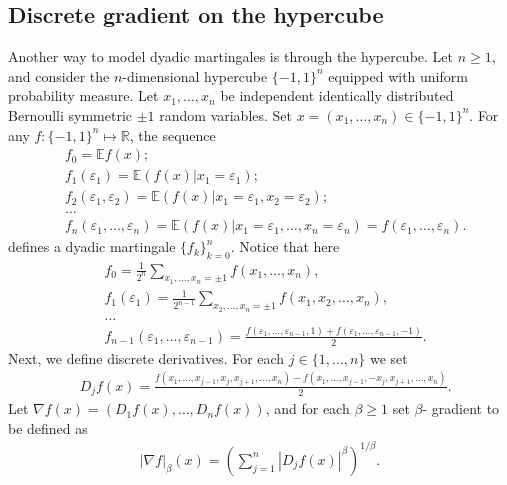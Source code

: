 \documentclass[11pt]{amsart}
\theoremstyle{definition}
\renewcommand{\1}{{\mathbbm{1}}}
\begin{document}
\subsection{Discrete gradient on the hypercube}\label{hypercc}
Another way to model dyadic martingales is through the hypercube. Let $n\geq 1$, and consider the $n$-dimensional hypercube $\{-1,1\}^{n}$ equipped with uniform probability measure. Let $x_{1}, \ldots, x_{n}$ be independent identically distributed Bernoulli symmetric  $\pm 1$ random variables. Set $x = (x_{1}, \ldots, x_{n}) \in \{-1,1\}^{n}$. For any $f:\{-1,1\}^{n} \mapsto \mathbb{R}$, the sequence
\begin{align*}
&f_{0}=\mathbb{E}f(x);\\
&f_{1}(\varepsilon_{1}) = \mathbb{E}(f(x)|x_{1}=\varepsilon_{1});\\
&f_{2}(\varepsilon_{1}, \varepsilon_{2}) = \mathbb{E}(f(x)|x_{1}=\varepsilon_{1}, x_{2}=\varepsilon_{2});\\
&\ldots \\
&f_{n}(\varepsilon_{1}, \ldots, \varepsilon_{n}) = \mathbb{E} (f(x)|x_{1}=\varepsilon_{1}, \ldots, x_{n}=\varepsilon_{n}) =f(\varepsilon_{1}, \ldots, \varepsilon_{n}). 
\end{align*}
defines a dyadic martingale $\{f_{k}\}_{k=0}^{n}$. Notice that here 
\begin{align*}
&f_{0} = \frac{1}{2^{n}}\sum_{x_{1}, \ldots, x_{n}=\pm 1} f(x_{1}, \ldots, x_{n}),\\
&f_{1}(\varepsilon_{1}) = \frac{1}{2^{n-1}}\sum_{x_{2}, \ldots, x_{n}=\pm 1} f(x_{1}, x_{2}, \ldots, x_{n}),\\
&\ldots\\
&f_{n-1}(\varepsilon_{1}, \ldots, \varepsilon_{n-1})=\frac{f(\varepsilon_{1}, \ldots, \varepsilon_{n-1}, 1)+f(\varepsilon_{1}, \ldots, \varepsilon_{n-1}, -1)}{2}.
\end{align*}
Next, we define discrete derivatives. For each $j \in \{1, \ldots, n\}$ we set 
\begin{align*}
    &D_{j}f(x) = 
    \frac{f(x_{1}, \ldots, x_{j-1}, x_{j}, x_{j+1}, \ldots, x_{n})-f(x_{1}, \ldots, x_{j-1}, -x_{j}, x_{j+1}, \ldots, x_{n})}{2}.
\end{align*}
Let $\nabla f(x)= (D_{1}f(x), \ldots, D_{n}f(x))$, and for each $\beta \geq 1$  set $\beta$- gradient to be defined as 
\begin{align*}
    |\nabla f|_{\beta}(x) = \left( \sum_{j=1}^{n} |D_{j}f(x)|^{\beta}\right)^{1/\beta}.
\end{align*}
\end{document}
